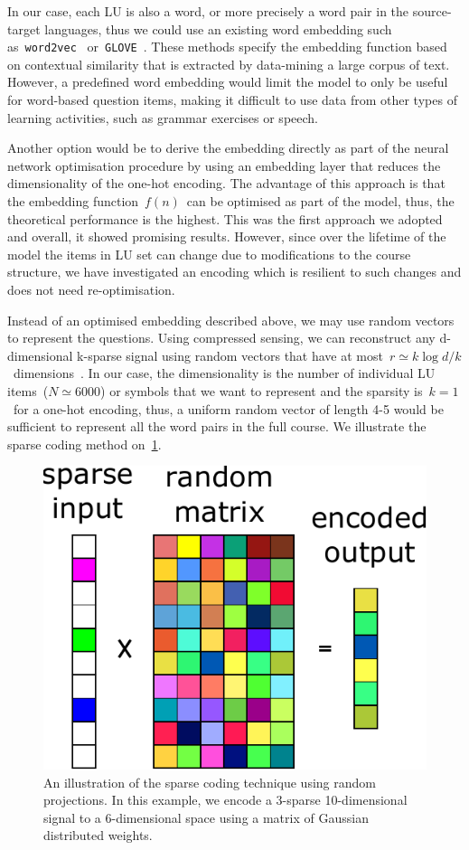 In our case, each LU is also a word, or more precisely a word pair in the source-target languages, thus we could use an existing word embedding such
as~\texttt{word2vec}~\cite{mikolov2013efficient} or~\texttt{GLOVE}~\cite{pennington2014glove}. These methods specify the embedding function based on contextual similarity that is extracted by data-mining a large corpus of text. However, a predefined word embedding would limit the model to only be useful for word-based question items, making it difficult to use data from other types of learning activities, such as grammar exercises or speech.

Another option would be to derive the embedding directly as part of the neural network optimisation procedure by using an embedding layer that reduces the dimensionality of the one-hot encoding. The advantage of this approach is that the embedding function~$f(n)$~can be optimised as part of the model, thus, the theoretical performance is the highest. This was the first approach we adopted and overall, it showed promising results. However, since over the lifetime of the model the items in LU set can change due to modifications to the course structure, we have investigated an encoding which is resilient to such changes and does not need re-optimisation.

Instead of an optimised embedding described above, we may use random vectors to represent the questions. Using compressed sensing, we can reconstruct any d-dimensional k-sparse signal using random vectors that have at most~$r \simeq k\log d/k$~dimensions~\cite{baraniuk2007compressive}. In our case, the dimensionality is the number of individual LU items~($N \simeq 6000$) or symbols that we want to represent and the sparsity is~$k=1$~for a one-hot encoding, thus, a uniform random vector of length 4-5 would be sufficient to represent all the word pairs in the full course. We illustrate the sparse coding method on~\cref{fig:sparse_coding}.

\begin{figure}[ht]
\centering
\includegraphics[width=0.3\linewidth]{figures/lingvist/sparse_coding.pdf}
\caption[An illustration of sparse coding]{An illustration of the sparse coding technique using random projections. In this example, we encode a 3-sparse 10-dimensional signal to a 6-dimensional space using a matrix of Gaussian distributed weights.} 
\label{fig:sparse_coding} 
\end{figure} 

